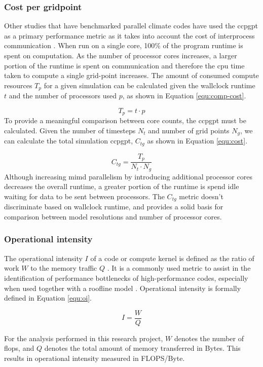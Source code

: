\documentclass[a4paper,11pt]{report}
\begin{document}
\subsubsection{Cost per gridpoint}
Other studies that have benchmarked parallel climate codes have used the \gls{ccpgpt} as a primary performance metric as it takes into account the cost of interprocess communication \cite{schmidt2007benchmark}. When run on a single core, 100\% of the program runtime is spent on computation. As the number of processor cores increases, a larger portion of the runtime is spent on communication and therefore the cpu time taken to compute a single grid-point increases. The amount of consumed compute resources $T_p$ for a given simulation can be calculated given the wallclock runtime $t$ and the number of processors used $p$, as shown in Equation \ref{equ:comp-cost}.
\par
\begin{equation}
T_p = t \cdot p
\label{equ:comp-cost}
\end{equation}
To provide a meaningful comparison between core counts, the \gls{ccpgpt} must be calculated. Given the number of timesteps $N_t$ and number of grid points $N_g$, we can calculate the total simulation \gls{ccpgpt}, $C_{tg}$ as shown in Equation \ref{equ:cost}. 

\begin{equation}
C_{tg} = \frac{T_p}{N_t \cdot N_g}
\label{equ:cost}
\end{equation}
Although increasing \gls{mimd} parallelism by introducing additional processor cores decreases the overall runtime, a greater portion of the runtime is spend idle waiting for data to be sent between processors. The $C_{tg}$ metric doesn't discriminate based on wallclock runtime, and provides a solid basis for comparison between model resolutions and number of processor cores. 

\subsubsection{Operational intensity}
The operational intensity $I$ of a code or compute kernel is defined as the ratio of work $W$ to the memory traffic $Q$ \cite{williams2009roofline}. It is a commonly used metric to assist in the identification of performance bottlenecks of high-performance codes, especially when used together with a roofline model \cite{williams2009roofline}. Operational intensity is formally defined in Equation \ref{equ:oi}.

\begin{equation}
\label{equ:oi}
I = \frac{W}{Q}
\end{equation}
\par
For the analysis performed in this research project, $W$ denotes the number of \gls{flops}, and $Q$ denotes the total amount of memory transferred in Bytes. This results in operational intensity measured in FLOPS/Byte. 
\end{document}
